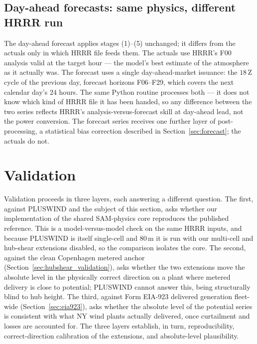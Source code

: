 \documentclass[11pt]{article}
\begin{document}
\subsection{Day-ahead forecasts: same physics, different HRRR run}

The day-ahead forecast applies stages (1)--(5) unchanged; it differs from
the actuals only in which HRRR file feeds them. The actuals use HRRR's
F00 analysis valid at the target hour --- the model's best estimate of
the atmosphere as it actually was. The forecast uses a single
day-ahead-market issuance: the $18$\,Z cycle of the previous day,
forecast horizons F06--F29, which covers the next calendar day's
$24$ hours. The same Python routine processes both --- it does not know
which kind of HRRR file it has been handed, so any difference between
the two series reflects HRRR's analysis-versus-forecast skill at
day-ahead lead, not the power conversion. The forecast series receives
one further layer of post-processing, a statistical bias correction
described in Section~\ref{sec:forecast}; the actuals do not.

\section{Validation}
\label{sec:validation}

Validation proceeds in three layers, each answering a different
question. The first, against PLUSWIND and the subject of this section,
asks whether our implementation of the shared SAM-physics core
reproduces the published reference. This is a model-versus-model check
on the same HRRR inputs, and because PLUSWIND is itself single-cell and
80\,m it is run with our multi-cell and hub-shear extensions disabled,
so the comparison isolates the core. The second, against the clean
Copenhagen metered anchor (Section~\ref{sec:hubshear_validation}), asks
whether the two extensions move the absolute level in the physically
correct direction on a plant where metered delivery is close to
potential; PLUSWIND cannot answer this, being structurally blind to hub
height. The third, against Form EIA-923 delivered generation fleet-wide
(Section~\ref{sec:eia923}), asks whether the absolute level of the
potential series is consistent with what NY wind plants actually
delivered, once curtailment and losses are accounted for. The three
layers establish, in turn, reproducibility, correct-direction
calibration of the extensions, and absolute-level plausibility.
\end{document}
